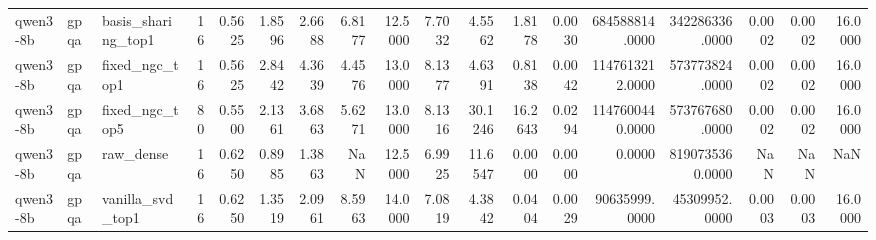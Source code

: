 \begin{table}[t]
\begin{tabular}{lllrrrrrrrrrrrrrrr}
qwen3-8b & gpqa & basis\_sharing\_top1 & 16 & 0.5625 & 1.8596 & 2.6688 & 6.8177 & 12.5000 & 7.7032 & 4.5562 & 1.8178 & 0.0030 & 684588814.0000 & 342286336.0000 & 0.0002 & 0.0002 & 16.0000 \\
qwen3-8b & gpqa & fixed\_ngc\_top1 & 16 & 0.5625 & 2.8442 & 4.3639 & 4.4576 & 13.0000 & 8.1377 & 4.6391 & 0.8138 & 0.0042 & 1147613212.0000 & 573773824.0000 & 0.0002 & 0.0002 & 16.0000 \\
qwen3-8b & gpqa & fixed\_ngc\_top5 & 80 & 0.5500 & 2.1361 & 3.6863 & 5.6271 & 13.0000 & 8.1316 & 30.1246 & 16.2643 & 0.0294 & 1147600440.0000 & 573767680.0000 & 0.0002 & 0.0002 & 16.0000 \\
qwen3-8b & gpqa & raw\_dense & 16 & 0.6250 & 0.8985 & 1.3863 & NaN & 12.5000 & 6.9925 & 11.6547 & 0.0000 & 0.0000 & 0.0000 & 8190735360.0000 & NaN & NaN & NaN \\
qwen3-8b & gpqa & vanilla\_svd\_top1 & 16 & 0.6250 & 1.3519 & 2.0961 & 8.5963 & 14.0000 & 7.0819 & 4.3842 & 0.0404 & 0.0029 & 90635999.0000 & 45309952.0000 & 0.0003 & 0.0003 & 16.0000 \\
\bottomrule
\end{tabular}

\end{table}
